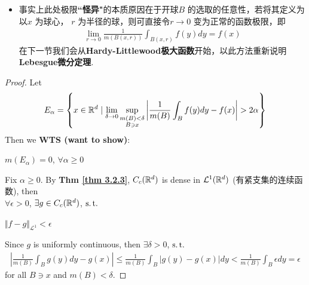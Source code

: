 \begin{thm}
\begin{rmk}
\begin{itemize}
				\item 事实上此处极限\textbf{``怪异"}的本质原因在于开球$B$ 的选取的任意性，若将其定义为以$x$ 为球心， $r$ 为半径的球，则可直接令$r \to 0$ 变为正常的函数极限，即
				\begin{align}
					\lim_{r \to 0}{\frac{1}{m(B(x , r))} \int_{B(x , r)}{f(y) dy}} = f(x)
				\end{align}
				在下一节我们会从\textbf{Hardy-Littlewood极大函数}开始，以此方法重新说明\textbf{Lebesgue微分定理}.
			\end{itemize}
		\end{rmk}
	
		\newpage
		\begin{proof}
			Let 
			\begin{align}
				E_\alpha 
				= \left\{ x \in \mathbb{R}^d \mid \lim_{\delta \to 0}{\sup_{\substack{m(B) < \delta \\ B \ni x}}{\left| \frac{1}{m(B)} \int_{B}{f(y) dy} - f(x) \right| > 2 \alpha}} \right\}
			\end{align}
			Then we \textbf{WTS (want to show)}:
			\begin{center}
				$m(E_\alpha) = 0$, $\forall \alpha \geq 0$
			\end{center}
			
			\vspace{1em}
			
			Fix $\alpha \geq 0$. By \textbf{Thm \ref{thm 3.2.3}}, $C_{c}(\mathbb{R}^d)$ is dense in $\mathcal{L}^{1}(\mathbb{R}^d)$ (有紧支集的连续函数), then \\
			$\forall \epsilon > 0$, $\exists g \in C_{c}(\mathbb{R}^d)$, $\operatorname{s.t.}$
			\begin{center}
				$\Vert f - g \Vert_{\mathcal{L}^1} < \epsilon$
			\end{center}
			Since $g$ is uniformly continuous, then $\exists \delta > 0$, $\operatorname{s.t.}$
			\begin{align}
				\left| \frac{1}{m(B)} \int_{B}{g(y) dy} - g(x) \right| 
				\leq \frac{1}{m(B)} \int_{B}{\left| g(y) - g(x) \right| dy}
				< \frac{1}{m(B)} \int_{B}{\epsilon dy} 
				= \epsilon
			\end{align}
			for all $B \ni x$ and $m(B) < \delta$. 
			
			\vspace{2em}
			

\end{proof}
\end{thm}
